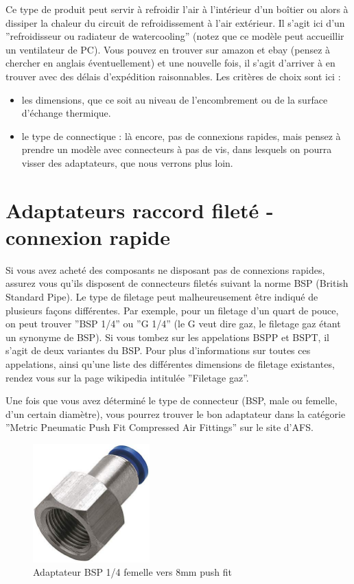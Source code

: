 \documentclass[a4paper, 11pt]{report}
\begin{document}
Ce type de produit peut servir à refroidir l'air à l'intérieur d'un
boîtier ou alors à dissiper la chaleur du circuit de refroidissement
à l'air extérieur. Il s'agit ici d'un ''refroidisseur ou radiateur
de watercooling'' (notez que ce modèle peut accueillir un ventilateur
de PC). Vous pouvez en trouver sur amazon et ebay (pensez à chercher
en anglais éventuellement) et une nouvelle fois, il s'agit d'arriver
à en trouver avec des délais d'expédition raisonnables. Les critères
de choix sont ici :
\begin{itemize}
\item les dimensions, que ce soit au niveau de l'encombrement ou de la surface
d'échange thermique.
\item le type de connectique : là encore, pas de connexions rapides, mais
pensez à prendre un modèle avec connecteurs à pas de vis, dans lesquels
on pourra visser des adaptateurs, que nous verrons plus loin.
\end{itemize}

\section{Adaptateurs raccord fileté - connexion rapide}

Si vous avez acheté des composants ne disposant pas de connexions
rapides, assurez vous qu'ils disposent de connecteurs filetés suivant
la norme BSP (British Standard Pipe). Le type de filetage peut malheureusement
être indiqué de plusieurs façons différentes. Par exemple, pour un
filetage d'un quart de pouce, on peut trouver ''BSP 1/4'' ou ''G
1/4'' (le G veut dire gaz, le filetage gaz étant un synonyme de BSP).
Si vous tombez sur les appelations BSPP et BSPT, il s'agit de deux
variantes du BSP. Pour plus d'informations sur toutes ces appelations,
ainsi qu'une liste des différentes dimensions de filetage existantes,
rendez vous sur la page wikipedia intitulée ''Filetage gaz''.

Une fois que vous avez déterminé le type de connecteur (BSP, male
ou femelle, d'un certain diamètre), vous pourrez trouver le bon adaptateur
dans la catégorie ''Metric Pneumatic Push Fit Compressed Air Fittings''
sur le site d'AFS. 

\begin{figure}[h]
\caption{Adaptateur BSP 1/4 femelle vers 8mm push fit}

\centering{}\includegraphics[width=0.4\textwidth]{images/threaded_adaptor.jpg}
\end{figure}
\end{document}
